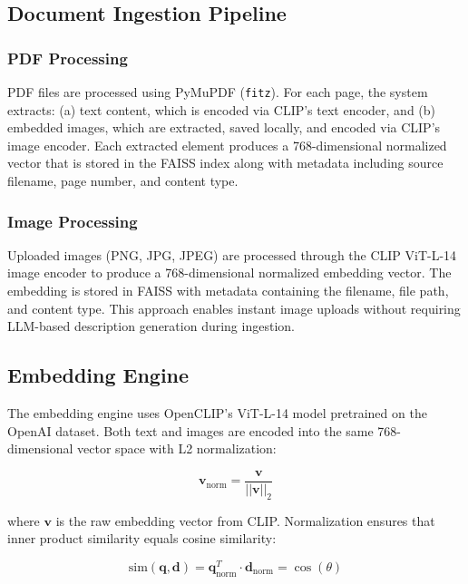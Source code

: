 \documentclass[conference]{IEEEtran}
\begin{document}
\subsection{Document Ingestion Pipeline}

\subsubsection{PDF Processing}
PDF files are processed using PyMuPDF (\texttt{fitz}). For each page, the system extracts: (a) text content, which is encoded via CLIP's text encoder, and (b) embedded images, which are extracted, saved locally, and encoded via CLIP's image encoder. Each extracted element produces a 768-dimensional normalized vector that is stored in the FAISS index along with metadata including source filename, page number, and content type.

\subsubsection{Image Processing}
Uploaded images (PNG, JPG, JPEG) are processed through the CLIP ViT-L-14 image encoder to produce a 768-dimensional normalized embedding vector. The embedding is stored in FAISS with metadata containing the filename, file path, and content type. This approach enables instant image uploads without requiring LLM-based description generation during ingestion.

\subsection{Embedding Engine}

The embedding engine uses OpenCLIP's ViT-L-14 model pretrained on the OpenAI dataset. Both text and images are encoded into the same 768-dimensional vector space with L2 normalization:

\begin{equation}
    \mathbf{v}_{\text{norm}} = \frac{\mathbf{v}}{||\mathbf{v}||_2}
\end{equation}

where $\mathbf{v}$ is the raw embedding vector from CLIP. Normalization ensures that inner product similarity equals cosine similarity:

\begin{equation}
    \text{sim}(\mathbf{q}, \mathbf{d}) = \mathbf{q}_{\text{norm}}^T \cdot \mathbf{d}_{\text{norm}} = \cos(\theta)
\end{equation}
\end{document}
